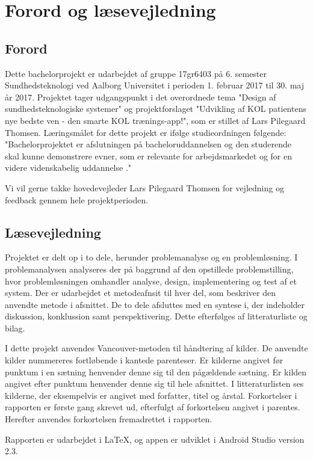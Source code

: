 \chapter*{Forord og læsevejledning}

\section*{Forord}
Dette bachelorprojekt er udarbejdet af gruppe 17gr6403 på 6. semester Sundhedsteknologi ved Aalborg Universitet i perioden 1. februar 2017 til 30. maj år 2017. Projektet tager udgangspunkt i det overordnede tema "Design af sundhedsteknologiske systemer" og projektforslaget "Udvikling af KOL patientens nye bedste ven - den smarte KOL trænings-app!", som er stillet af Lars Pilegaard Thomsen. 
Læringsmålet for dette projekt er ifølge studieordningen følgende: "Bachelorprojektet er afslutningen på bacheloruddannelsen og den studerende skal kunne demonstrere evner, som er relevante for arbejdsmarkedet og for en videre videnskabelig uddannelse \cite{Studieordning2014}."

Vi vil gerne takke hovedevejleder Lars Pilegaard Thomsen for vejledning og feedback gennem hele projektperioden.

\section*{Læsevejledning}
Projektet er delt op i to dele, herunder problemanalyse og en problemløsning. I problemanalysen analyseres der på baggrund af den opstillede problemstilling, hvor problemløsningen omhandler analyse, design, implementering og test af et system. Der er udarbejdet et metodeafnsit til hver del, som beskriver den anvendte metode i afsnittet. De to dele afsluttes med en syntese i, der indeholder diskussion, konklussion samt perspektivering. Dette efterfølges af litteraturliste og bilag. 

I dette projekt anvendes Vancouver-metoden til håndtering af kilder. De anvendte kilder nummereres fortløbende i kantede parenteser. Er kilderne angivet før punktum i en sætning henvender denne sig til den pågældende sætning. Er kilden angivet efter punktum henvender denne sig til hele afsnittet. I litteraturlisten ses kilderne, der eksempelvis er angivet med forfatter, titel og årstal. Forkortelser i rapporten er første gang skrevet ud, efterfulgt af forkortelsen angivet i parentes. Herefter anvendes forkortelsen fremadrettet i rapporten.

Rapporten er udarbejdet i \LaTeX, og appen er udviklet i Android Studio version 2.3.